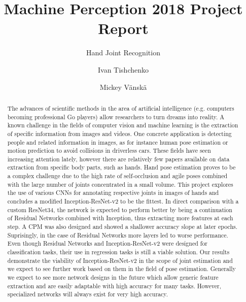 \documentclass[sigconf]{acmart}
\begin{document}
\title{Machine Perception 2018 \textendash{} Project Report}
\subtitle{Hand Joint Recognition}

\author{Ivan Tishchenko}

\author{Mickey Vänskä}

\begin{abstract}
The advances of scientific methods in the area of artificial intelligence (e.g. computers becoming professional Go players) allow researchers to turn dreams into reality. A known challenge in the fields of computer vision and machine learning is the extraction of specific information from images and videos.
One concrete application is detecting people and related information in images, as for instance human pose estimation or motion prediction to avoid collisions in driverless cars. These fields have seen increasing attention lately, however there are relatively few papers available on data extraction from specific body parts, such as hands.
Hand pose estimation proves to be a complex challenge due to the high rate of self-occlusion and agile poses combined with the large number of joints concentrated in a small volume.
This project explores the use of various CNNs for annotating respective joints in images of hands and concludes a modified Inception-ResNet-v2 to be the fittest.
In direct comparison with a custom ResNet34, the network is expected to perform better by being a continuation of Residual Networks combined with Inception, thus extracting more features at each step. A CPM was also designed and showed a shallower accuracy slope at later epochs. Suprisingly, in the case of Residual Networks more layers led to worse performance.
Even though Residual Networks and Inception-ResNet-v2 were designed for classification tasks, their use in regression tasks is still a viable solution. Our results demonstrate the viability of Inception-ResNet-v2 in the scope of joint estimation and we expect to see further work based on them in the field of pose estimation.
Generally we expect to see more network designs in the future which allow generic feature extraction and are easily adaptable with high accuracy for many tasks. However, specialized networks will always exist for very high accuracy.
\end{abstract}

\maketitle




\end{document}
